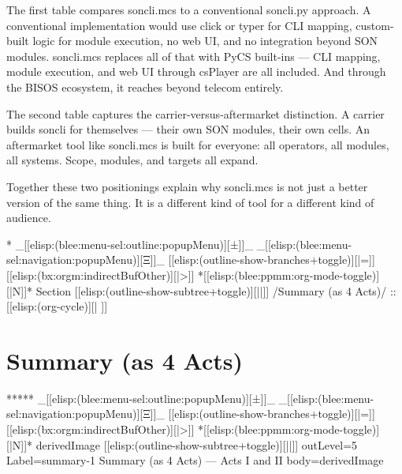 \begin{verblatex}
\begin{frame}[fragile,plain,label=sonclimcsPositionings]
{  The first table compares soncli.mcs to a conventional soncli.py approach.
  A conventional implementation would use click or typer for CLI mapping,
  custom-built logic for module execution, no web UI, and no integration
  beyond SON modules. soncli.mcs replaces all of that with PyCS built-ins ---
  CLI mapping, module execution, and web UI through csPlayer are all included.
  And through the BISOS ecosystem, it reaches beyond telecom entirely.

  The second table captures the carrier-versus-aftermarket distinction.
  A carrier builds soncli for themselves --- their own SON modules, their own
  cells. An aftermarket tool like soncli.mcs is built for everyone: all
  operators, all modules, all systems. Scope, modules, and targets all expand.

  Together these two positionings explain why soncli.mcs is not just a
  better version of the same thing. It is a different kind of tool for a
  different kind of audience.
}

\end{frame}
\end{verblatex}



\begin{whenOrg}
*  _[[elisp:(blee:menu-sel:outline:popupMenu)][±]]_ _[[elisp:(blee:menu-sel:navigation:popupMenu)][Ξ]]_ [[elisp:(outline-show-branches+toggle)][|=]] [[elisp:(bx:orgm:indirectBufOther)][|>]] *[[elisp:(blee:ppmm:org-mode-toggle)][|N]]*  Section    [[elisp:(outline-show-subtree+toggle)][||]]   /Summary (as 4 Acts)/ ::  [[elisp:(org-cycle)][| ]]
\end{whenOrg}

\section{Summary (as 4 Acts)}

\begin{whenOrg}
*****  _[[elisp:(blee:menu-sel:outline:popupMenu)][±]]_ _[[elisp:(blee:menu-sel:navigation:popupMenu)][Ξ]]_ [[elisp:(outline-show-branches+toggle)][|=]] [[elisp:(bx:orgm:indirectBufOther)][|>]] *[[elisp:(blee:ppmm:org-mode-toggle)][|N]]*  derivedImage [[elisp:(outline-show-subtree+toggle)][||]] outLevel=5 Label=summary-1 Summary (as 4 Acts) --- Acts I and II body=derivedImage

\end{whenOrg}

